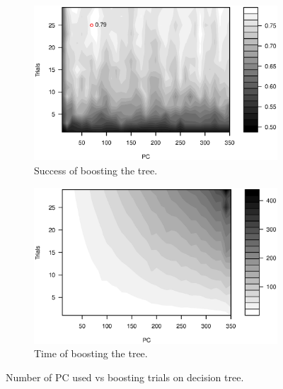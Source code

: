 \begin{figure}[H]
\centering
    \begin{subfigure}[t]{0.49\textwidth}
        \includegraphics[width=\textwidth]{graphics/tree_pca_vs_boost_success}
        \caption{Success of boosting the tree.}
        \label{fig:tree_pca_boost_success}
    \end{subfigure}
    \begin{subfigure}[t]{0.49\textwidth}
        \includegraphics[width=\textwidth]{graphics/tree_pca_vs_boost_time}
        \caption{Time of boosting the tree.}
        \label{fig:tree_pca_boost_timing}
    \end{subfigure}
\caption{Number of PC used vs boosting trials on decision tree.}
\label{fig:tree_pca_boost}
\end{figure}


